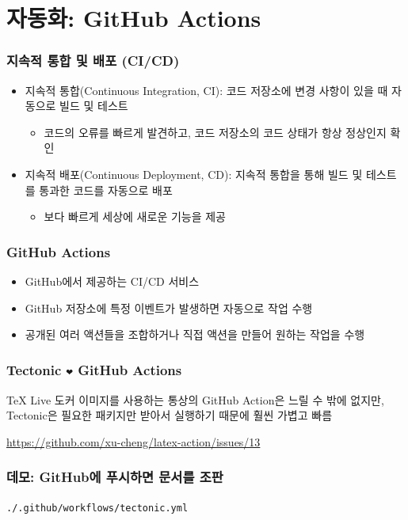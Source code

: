 \section{자동화: GitHub Actions}
\begin{frame}[c]
  \frametitle{지속적 통합 및 배포 (CI/CD)}

  \begin{itemize}
    \item 지속적 통합(Continuous Integration, CI): 코드 저장소에 변경 사항이 있을 때 자동으로 빌드 및 테스트
      \begin{itemize}
        \item 코드의 오류를 빠르게 발견하고, 코드 저장소의 코드 상태가 항상 정상인지 확인
      \end{itemize}
    \item 지속적 배포(Continuous Deployment, CD): 지속적 통합을 통해 빌드 및 테스트를 통과한 코드를 자동으로 배포
      \begin{itemize}
        \item 보다 빠르게 세상에 새로운 기능을 제공
      \end{itemize}
  \end{itemize}
\end{frame}

\begin{frame}[c]
  \frametitle{GitHub Actions}

  \begin{itemize}
    \item GitHub에서 제공하는 CI/CD 서비스
    \item GitHub 저장소에 특정 이벤트가 발생하면 자동으로 작업 수행
    \item 공개된 여러 액션들을 조합하거나 직접 액션을 만들어 원하는 작업을 수행
  \end{itemize}
\end{frame}

\begin{frame}[c]
  \frametitle{Tectonic \texttt{❤} GitHub Actions}

  TeX Live 도커 이미지를 사용하는 통상의 GitHub Action은 느릴 수 밖에 없지만,
  Tectonic은 필요한 패키지만 받아서 실행하기 때문에 훨씬 가볍고 빠름

  \url{https://github.com/xu-cheng/latex-action/issues/13}
\end{frame}

\begin{frame}[c,fragile]
  \frametitle{데모: GitHub에 푸시하면 문서를 조판}

  \texttt{./.github/workflows/tectonic.yml}
\end{frame}


